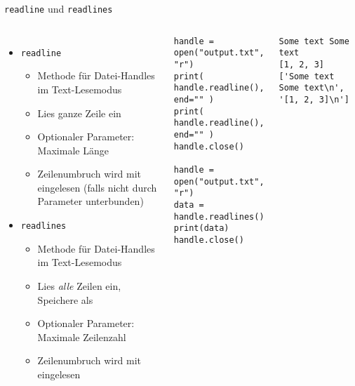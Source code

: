 \begin{frame}[fragile]{\texttt{readline} und \texttt{readlines}}
%
\begin{columns}[T]
\begin{itemize}
\item \texttt{readline}
	\begin{itemize}
	\item Methode für Datei-Handles im Text-Lesemodus
	\item Lies ganze Zeile ein
	\item Optionaler Parameter: Maximale Länge
	\item Zeilenumbruch wird mit eingelesen (falls nicht durch Parameter unterbunden)
	\end{itemize}
\item \texttt{readlines}
	\begin{itemize}
	\item Methode für Datei-Handles im Text-Lesemodus
	\item Lies \emph{alle} Zeilen ein, Speichere als 
	\item Optionaler Parameter: Maximale Zeilenzahl
	\item Zeilenumbruch wird mit eingelesen
	\end{itemize}
\end{itemize}
%
\begin{codebox}
\begin{verbatim}
handle = open("output.txt", "r")
print( handle.readline(), end="" )
print( handle.readline(), end="" )
handle.close()

handle = open("output.txt", "r")
data = handle.readlines()
print(data)
handle.close()
\end{verbatim}
\end{codebox}
%
\begin{cmdbox}[Ausgabe]
\begin{verbatim}
Some text Some text
[1, 2, 3]
['Some text Some text\n', '[1, 2, 3]\n']
\end{verbatim}
\end{cmdbox}
%
\end{columns}
%
\end{frame}


